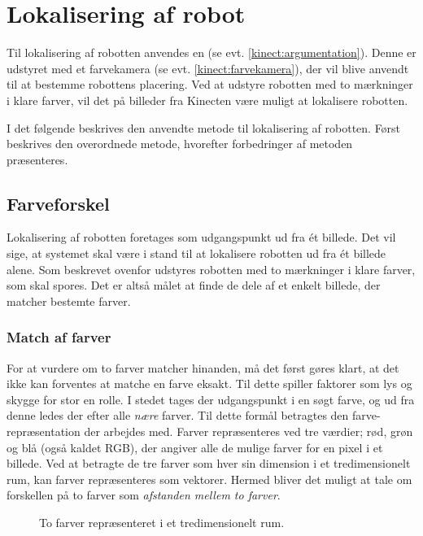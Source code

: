 \section{Lokalisering af robot}\label{tracking}
Til lokalisering af robotten anvendes en \kinect (se evt. \cref{kinect:argumentation}).
Denne er udstyret med et farvekamera (se evt. \cref{kinect:farvekamera}), der vil blive anvendt til at bestemme robottens placering.
Ved at udstyre robotten med to mærkninger i klare farver, vil det på billeder fra Kinecten være muligt at lokalisere robotten.

I det følgende beskrives den anvendte metode til lokalisering af robotten.
Først beskrives den overordnede metode, hvorefter forbedringer af metoden præsenteres.

\subsection{Farveforskel}\label{tracking:colordiff}
Lokalisering af robotten foretages som udgangspunkt ud fra \'et billede.
Det vil sige, at systemet skal være i stand til at lokalisere robotten ud fra \'et billede alene.
Som beskrevet ovenfor udstyres robotten med to mærkninger i klare farver, som skal spores.
Det er altså målet at finde de dele af et enkelt billede, der matcher bestemte farver.

\subsubsection{Match af farver}
For at vurdere om to farver matcher hinanden, må det først gøres klart, at det ikke kan forventes at matche en farve eksakt.
Til dette spiller faktorer som lys og skygge for stor en rolle.
I stedet tages der udgangspunkt i en søgt farve, og ud fra denne ledes der efter alle \textit{nære} farver.
Til dette formål betragtes den farve-repræsentation der arbejdes med.
Farver repræsenteres ved tre værdier; rød, grøn og blå (også kaldet RGB), der angiver alle de mulige farver for en pixel i et billede.
Ved at betragte de tre farver som hver sin dimension i et tredimensionelt rum, kan farver repræsenteres som vektorer.
Hermed bliver det muligt at tale om forskellen på to farver som \textit{afstanden mellem to farver}.

\begin{figure}
\centering

\caption{To farver repræsenteret i et tredimensionelt rum.}
\label{tracking:colorspace}
\end{figure}

